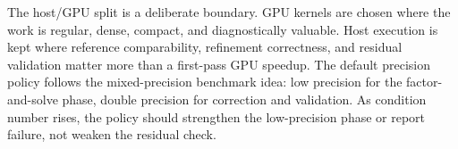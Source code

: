\documentclass[11pt]{article}
\begin{document}
The host/GPU split is a deliberate boundary. GPU kernels are chosen where the
work is regular, dense, compact, and diagnostically valuable. Host execution is
kept where reference comparability, refinement correctness, and residual
validation matter more than a first-pass GPU speedup. The default precision
policy follows the mixed-precision benchmark idea: low precision for the
factor-and-solve phase, double precision for correction and validation. As
condition number rises, the policy should strengthen the low-precision phase
or report failure, not weaken the residual check.



\end{document}
